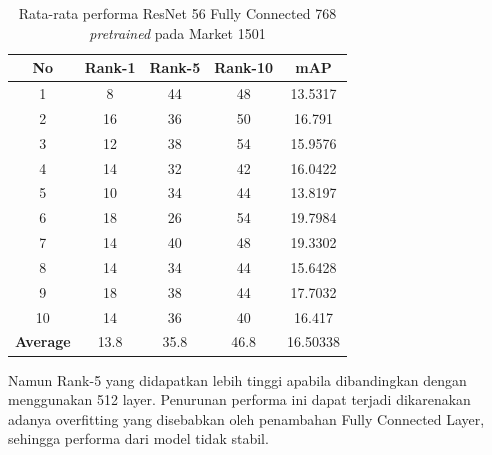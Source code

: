 \begin{longtable}{|c|c|c|c|c|}
	\caption{Rata-rata performa ResNet 56 Fully Connected 768 \textit{pretrained} pada Market 1501}
	\label{tabel: 12}\\
	\hline
	\rowcolor[HTML]{C0C0C0}
	\textbf{No} &\textbf{Rank-1} & \textbf{Rank-5} & \textbf{Rank-10} & \textbf{mAP} \\
	\hline
	1 &8 &44 &48 &13.5317 \\
	2 &16 &36 &50 &16.791 \\
	3 &12 &38 &54 &15.9576 \\
	4 &14 &32 &42 &16.0422 \\
	5 &10 &34 &44 &13.8197 \\
	6 &18 &26 &54 &19.7984 \\
	7 &14 &40 &48 &19.3302 \\
	8 &14 &34 &44 &15.6428 \\
	9 &18 &38 &44 &17.7032 \\
	10 &14 &36 &40 &16.417 \\
	\hline
	\textbf{Average} & 13.8 & 35.8 & 46.8 &16.50338 \\
	\hline
\end{longtable}

 Namun Rank-5 yang didapatkan lebih tinggi apabila dibandingkan dengan menggunakan 512 layer. Penurunan performa ini dapat terjadi dikarenakan adanya overfitting yang disebabkan oleh penambahan Fully Connected Layer, sehingga performa dari model tidak stabil.

